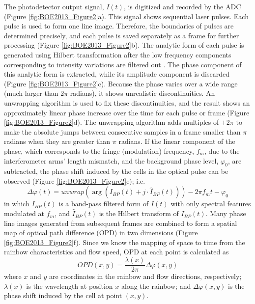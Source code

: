 The photodetector output signal, $I(t)$, is digitized and recorded by the ADC (Figure \ref{fig:BOE2013_Figure2}a). This signal shows sequential laser pulses. Each pulse is used to form one line image. Therefore, the boundaries of pulses are determined precisely, and each pulse is saved separately as a frame for further processing (Figure \ref{fig:BOE2013_Figure2}b). The analytic form of each pulse is generated using Hilbert transformation after the low frequency components corresponding to intensity variations are filtered out \cite{ikeda2005hilbert}. The phase component of this analytic form is extracted, while its amplitude component is discarded (Figure \ref{fig:BOE2013_Figure2}c). Because the phase varies over a wide range (much larger than $2 \pi$ radians), it shows unrealistic discontinuities. An unwrapping algorithm is used to fix these discontinuities, and the result shows an approximately linear phase increase over the time for each pulse or frame (Figure \ref{fig:BOE2013_Figure2}d). The unwrapping algorithm adds multiples of $\pm 2 \pi$ to make the absolute jumps between consecutive samples in a frame smaller than $\pi$ radians when they are greater than $\pi$ radians. If the linear component of the phase, which corresponds to the fringe (modulation) frequency, $f_m$, due to the interferometer arms’ length mismatch, and the background phase level, $\varphi_0$, are subtracted, the phase shift induced by the cells in the optical pulse can be observed (Figure \ref{fig:BOE2013_Figure2}e); i.e. 
\begin{equation}
\Delta\varphi(t)= unwrap(\arg(I_{BP}(t)+j \cdot \hat{I}_{BP}(t))) - 2 \pi f_m t - \varphi_0
\end{equation}
in which $I_{BP}(t)$ is a band-pass filtered form of $I(t)$ with only spectral features modulated at $f_m$, and $\hat{I}_{BP}(t)$ is the Hilbert transform of $I_{BP}(t)$. Many phase line images generated from subsequent frames are combined to form a spatial map of optical path difference (OPD) in two dimensions (Figure \ref{fig:BOE2013_Figure2}f). Since we know the mapping of space to time from the rainbow characteristics and flow speed, OPD at each point is calculated as
\begin{equation}
OPD(x,y) = \frac{\lambda(x)}{2 \pi} \Delta\varphi(x,y)
\end{equation}
where $x$ and $y$ are coordinates in the rainbow and flow directions, respectively; $\lambda(x)$ is the wavelength at position $x$ along the rainbow; and $\Delta\varphi(x,y)$ is the phase shift induced by the cell at point $(x,y)$.

